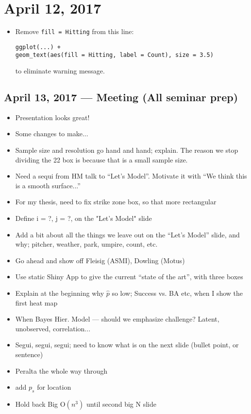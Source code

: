 \documentclass{article}
\begin{document}
\section*{April 12, 2017}
\begin{itemize}
\item Remove \verb|fill = Hitting| from this line:
\begin{verbatim}
ggplot(...) +
geom_text(aes(fill = Hitting, label = Count), size = 3.5)
\end{verbatim}
to eliminate warning message.
\end{itemize}

\subsection*{April 13, 2017 --- Meeting (All seminar prep)}
\begin{itemize}
\item Presentation looks great!
\item Some changes to make...
\item Sample size and resolution go hand and hand; explain. The reason we stop dividing the 22 box is because that is a small sample size.
\item Need a sequi from HM talk to ``Let's Model''. Motivate it with ``We think this is a smooth surface...''
\item For my thesis, need to fix strike zone box, so that more rectangular
\item Define i = ?, j = ?, on the "Let's Model" slide
\item Add a bit about all the things we leave out on the ``Let's Model'' slide, and why; pitcher, weather, park, umpire, count, etc.
\item Go ahead and show off Fleisig (ASMI), Dowling (Motus)
\item Use static Shiny App to give the current ``state of the art'', with three boxes
\item Explain at the beginning why $\hat{p}$ so low; Success vs. BA etc, when I show the first heat map
\item When Bayes Hier. Model --- should we emphasize challenge? Latent, unobserved, correlation...
\item Segui, segui, segui; need to know what is on the next slide (bullet point, or sentence)
\item Peralta the whole way through
\item add $p_{s}$ for location
\item Hold back Big O$(n^{3})$ until second big N slide

\end{itemize}
\end{document}
